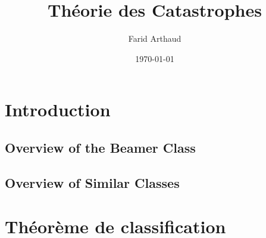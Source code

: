 \documentclass[red]{beamer}
\author{Farid Arthaud}
\title{Théorie des Catastrophes}
\date{\today}
\begin{document}
\frame{\titlepage}

\frame{\tableofcontents}
\section{Introduction}
\subsection{Overview of the Beamer Class}
\subsection{Overview of Similar Classes}
\section{Théorème de classification}
\end{document}
